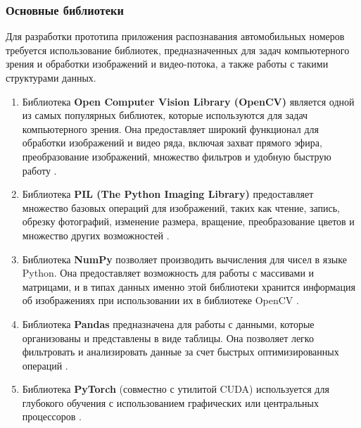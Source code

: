\documentclass[a4paper,12pt]{article}
\begin{document}
\subsubsection{Основные библиотеки}

Для разработки прототипа приложения распознавания автомобильных номеров требуется использование библиотек, предназначенных для задач компьютерного зрения и обработки изображений и видео-потока, а также работы с такими структурами данных.

\begin{enumerate}
    \item Библиотека \textbf{Open Computer Vision Library (OpenCV)} является одной из самых популярных библиотек, которые используются для задач компьютерного зрения. Она предоставляет широкий функционал для обработки изображений и видео ряда, включая захват прямого эфира, преобразование изображений, множество фильтров и удобную быструю работу \cite{opencv}.
    \item Библиотека \textbf{PIL (The Python Imaging Library)} предоставляет множество базовых операций для изображений, таких как чтение, запись, обрезку фотографий, изменение размера, вращение, преобразование цветов и множество других возможностей \cite{solem}.
    \item Библиотека \textbf{NumPy} позволяет производить вычисления для чисел в языке Python. Она предоставляет возможность для работы с массивами и матрицами, и в типах данных именно этой библиотеки хранится информация об изображениях при использовании их в библиотеке OpenCV \cite{solem}.
    \item Библиотека \textbf{Pandas} предназначена для работы с данными, которые организованы и представлены в виде таблицы. Она позволяет легко фильтровать и анализировать данные за счет быстрых оптимизированных операций \cite{python}.
    \item Библиотека \textbf{PyTorch} (совместно с утилитой CUDA) используется для глубокого обучения с использованием графических или центральных процессоров \cite{pytorch}. 
\end{enumerate}
\end{document}

